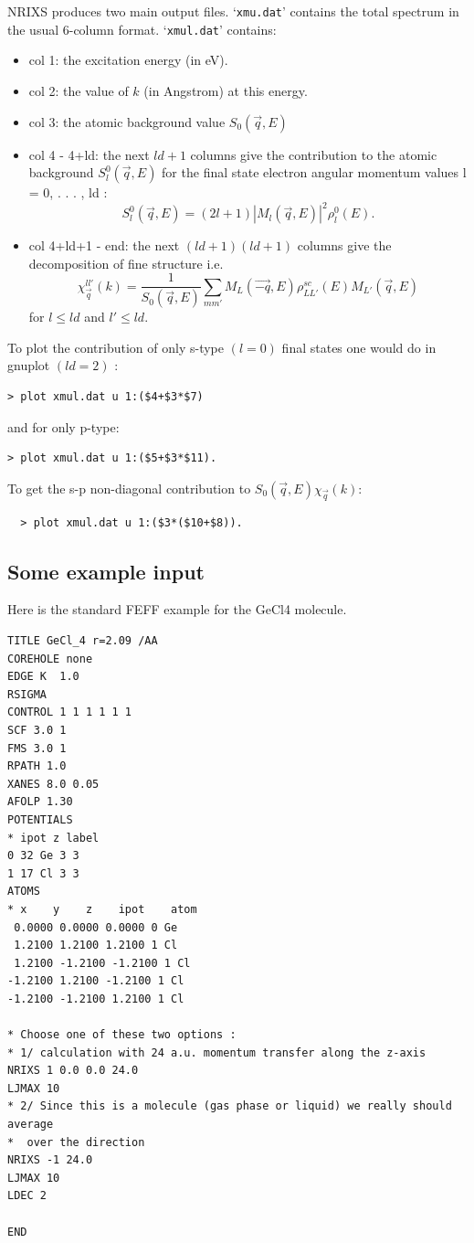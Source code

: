 \documentclass[11pt,oneside]{report} %
\newcommand{\file}[1]{`\texttt{#1}'}
\begin{document}
NRIXS produces two main output files.  \file{xmu.dat} contains the total spectrum in the usual 6-column format.  \file{xmul.dat} contains:
\begin{itemize}
\item col 1:  the excitation energy (in eV).
\item col 2:  the value of $k$ (in Angstrom) at this energy.
\item col 3:  the atomic background value $S_0(\vec{q},E)$
\item col 4 - 4+ld:  the next $ld+1$ columns give the contribution to the atomic background $S_l^0(\vec{q},E)$ for the final
state electron angular momentum values l = 0, . . . , ld :
\begin{equation} \label{nrixseq1}
S_l^0(\vec{q},E) = (2l + 1) |M_l(\vec{q},E)|^2 \rho_{l}^0 (E).
\end{equation}
\item col 4+ld+1 - end:  the next $(ld+1)  (ld+1)$ columns give the decomposition of fine structure i.e.
\begin{equation} \label{nrixseq2}
\chi_{\vec{q}}^{ll'}(k) = \frac {1} {S_0(\vec{q},E)} \sum_{mm'} {M_L(\vec{-q},E)\rho_{LL'}^{sc}(E)M_{L'}(\vec{q},E)}
\end{equation}
for $l \leq ld$ and $l' \leq ld$.
\end{itemize}

To plot the contribution of only s-type $(l = 0)$ final states one would do in gnuplot $(ld = 2)$ :
\begin{verbatim}
> plot xmul.dat u 1:($4+$3*$7)
\end{verbatim}
and for only p-type:
\begin{verbatim}
> plot xmul.dat u 1:($5+$3*$11).
\end{verbatim}
To get the s-p non-diagonal contribution to $S_0(\vec{q},E) \chi_{\vec{q}}(k)$:
\begin{verbatim}
  > plot xmul.dat u 1:($3*($10+$8)). 
\end{verbatim}

\subsection{Some example input}
Here is the standard FEFF example for the GeCl4 molecule.
\begin{verbatim}
TITLE GeCl_4 r=2.09 /AA
COREHOLE none
EDGE K  1.0
RSIGMA
CONTROL 1 1 1 1 1 1
SCF 3.0 1
FMS 3.0 1
RPATH 1.0
XANES 8.0 0.05
AFOLP 1.30
POTENTIALS
* ipot z label
0 32 Ge 3 3
1 17 Cl 3 3
ATOMS
* x    y    z    ipot    atom
 0.0000 0.0000 0.0000 0 Ge
 1.2100 1.2100 1.2100 1 Cl 
 1.2100 -1.2100 -1.2100 1 Cl
-1.2100 1.2100 -1.2100 1 Cl
-1.2100 -1.2100 1.2100 1 Cl

* Choose one of these two options :
* 1/ calculation with 24 a.u. momentum transfer along the z-axis
NRIXS 1 0.0 0.0 24.0
LJMAX 10
* 2/ Since this is a molecule (gas phase or liquid) we really should average 
*  over the direction
NRIXS -1 24.0
LJMAX 10
LDEC 2

END
\end{verbatim}
\end{document}
